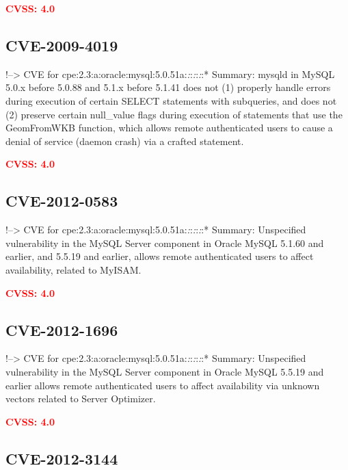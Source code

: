 \documentclass[a4paper, 12pt]{article}
\begin{document}
\textbf{\textcolor{red}{CVSS: 4.0}}

\hypertarget{cve-2009-4019}{%
\subsection{CVE-2009-4019}\label{cve-2009-4019}}

!--\textgreater{} CVE for
cpe:2.3:a:oracle:mysql:5.0.51a:\emph{:}:\emph{:}:\emph{:}:* Summary:
mysqld in MySQL 5.0.x before 5.0.88 and 5.1.x before 5.1.41 does not (1)
properly handle errors during execution of certain SELECT statements
with subqueries, and does not (2) preserve certain null\_value flags
during execution of statements that use the GeomFromWKB function, which
allows remote authenticated users to cause a denial of service (daemon
crash) via a crafted statement.

\textbf{\textcolor{red}{CVSS: 4.0}}

\hypertarget{cve-2012-0583}{%
\subsection{CVE-2012-0583}\label{cve-2012-0583}}

!--\textgreater{} CVE for
cpe:2.3:a:oracle:mysql:5.0.51a:\emph{:}:\emph{:}:\emph{:}:* Summary:
Unspecified vulnerability in the MySQL Server component in Oracle MySQL
5.1.60 and earlier, and 5.5.19 and earlier, allows remote authenticated
users to affect availability, related to MyISAM.

\textbf{\textcolor{red}{CVSS: 4.0}}

\hypertarget{cve-2012-1696}{%
\subsection{CVE-2012-1696}\label{cve-2012-1696}}

!--\textgreater{} CVE for
cpe:2.3:a:oracle:mysql:5.0.51a:\emph{:}:\emph{:}:\emph{:}:* Summary:
Unspecified vulnerability in the MySQL Server component in Oracle MySQL
5.5.19 and earlier allows remote authenticated users to affect
availability via unknown vectors related to Server Optimizer.

\textbf{\textcolor{red}{CVSS: 4.0}}

\hypertarget{cve-2012-3144}{%
\subsection{CVE-2012-3144}\label{cve-2012-3144}}
\end{document}
